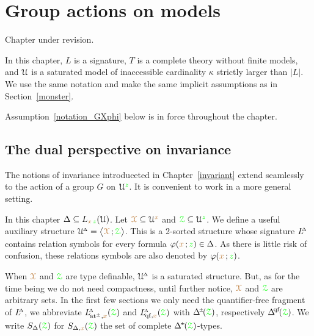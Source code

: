 \chapter{Group actions on models}
\label{actions}

\def\medrel#1{\parbox[t]{5ex}{$\displaystyle\hfil #1$}}
\def\ceq#1#2#3{\parbox[t]{17ex}{$\displaystyle #1$}\medrel{#2}{$\displaystyle #3$}}

\noindent\llap{\textcolor{red}{\Large\warning}\kern1.5ex}\ignorespaces
Chapter under revision.

In this chapter, $L$ is a signature, $T$ is a complete theory without finite models, and $\EuScript U$ is a saturated model of inaccessible cardinality $\kappa$ strictly larger than $|L|$.
We use the same notation and make the same implicit assumptions as in Section~\ref{monster}.

Assumption~\ref{notation_GXphi} below is in force throughout the chapter. 

\section{The dual perspective on invariance}\label{dual_perspective}

The notions of invariance introduceted in Chapter~\ref{invariant} extend seamlessly to the action of a group $G$ on $\EuScript U^{\color{green} z}$.
It is convenient to work in a more general setting.

In this chapter $\Delta\subseteq L_{{\color{brown} x}\,{\color{green} z}}(\EuScript U)$.
Let ${\color{brown}\EuScript X}\subseteq\EuScript U^{\color{brown} x}$ and ${\color{green}\EuScript Z}\subseteq\EuScript U^{\color{green} z}$.
We define a useful auxiliary structure $\EuScript U\kern-.2ex^{\scriptscriptstyle\Delta}=\big\langle{\color{brown}\EuScript X}\,;{\color{green}\EuScript Z}\big\rangle$.
This is a 2-sorted structure whose signature $L\kern-.5ex^{\scriptscriptstyle\Delta}$ contains relation symbols for every formula $\varphi({\color{brown} x}\,;{\color{green} z})\in\Delta$.
As there is little risk of confusion, these relations symbols are also denoted by $\varphi({\color{brown} x}\,;{\color{green} z})$.

When ${\color{brown}\EuScript X}$ and ${\color{green}\EuScript Z}$ are type definable, $\EuScript U\kern-.2ex^{\scriptscriptstyle\Delta}$ is a saturated structure.
But, as for the time being we do not need compactness, until further notice, ${\color{brown}\EuScript X}$ and ${\color{green}\EuScript Z}$ are arbitrary sets.
In the first few sections we only need the quantifier-free fragment of $L\kern-.5ex^{\scriptscriptstyle\Delta}$, we abbreviate $L\kern-.5ex^{\scriptscriptstyle\Delta}_{{\rm\,at^\pm},{\color{brown} x}}({\color{green}\EuScript Z})$ and $L\kern-.5ex^{\scriptscriptstyle\Delta}_{{\rm\,qf},{\color{brown} x}}({\color{green}\EuScript Z})$ with $\pmDelta(\grZ)$, respectively $\qfDelta(\grZ)$.
We write $S_\Delta({\color{green}\EuScript Z})$ for $S_{\Delta,{\color{brown} x}}({\color{green}\EuScript Z})$ the set of complete $\pmDelta(\grZ)$-types.

